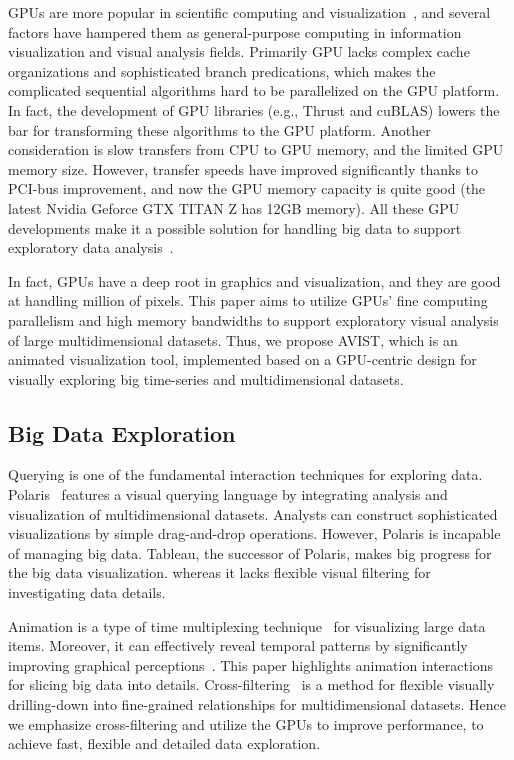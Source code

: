 GPUs are more popular in scientific computing and visualization~\cite{volume}, and several factors have hampered them as general-purpose computing in information visualization and visual analysis fields. Primarily GPU lacks complex cache organizations and sophisticated branch predications, which makes the complicated sequential algorithms hard to be parallelized on the GPU platform. In fact,  the development of GPU libraries (e.g., Thrust and cuBLAS) lowers the bar for transforming these algorithms to the GPU platform. Another consideration is slow transfers from CPU to GPU memory, and the limited GPU memory size. However, transfer speeds have improved significantly thanks to PCI-bus improvement, and now the GPU memory capacity is quite good (the latest Nvidia Geforce GTX TITAN Z has 12GB memory).  All these GPU developments make it  a possible solution for handling big data to support exploratory data analysis~\cite{Pawliczek}. 

In fact, GPUs have a deep root in graphics and visualization, and they are good at handling million of pixels. This paper aims to utilize GPUs' fine computing parallelism and high memory bandwidths to support exploratory visual analysis of large multidimensional datasets. Thus, we propose AVIST, which is an animated visualization tool, implemented based on a GPU-centric design for visually exploring big time-series and multidimensional datasets. 

\subsection{Big Data Exploration}
Querying is one of the fundamental interaction techniques for exploring data. Polaris~\cite{polaris} features a visual querying language by integrating analysis and visualization of multidimensional datasets. Analysts can construct sophisticated visualizations by simple drag-and-drop operations. However, Polaris is incapable of managing big data. Tableau, the successor of Polaris, makes big progress for the big data visualization.  whereas it lacks flexible visual filtering for investigating data details.

Animation is a type of time multiplexing technique~\cite{Fekete} for visualizing large data items. Moreover, it can effectively reveal temporal patterns by significantly improving graphical perceptions~\cite{animated}. This paper highlights animation interactions for slicing big data into details. Cross-filtering~\cite{weaver2010} is a method for flexible visually drilling-down into fine-grained relationships for multidimensional datasets. Hence we emphasize cross-filtering and utilize the GPUs to improve performance, to achieve fast, flexible and detailed data exploration. 


